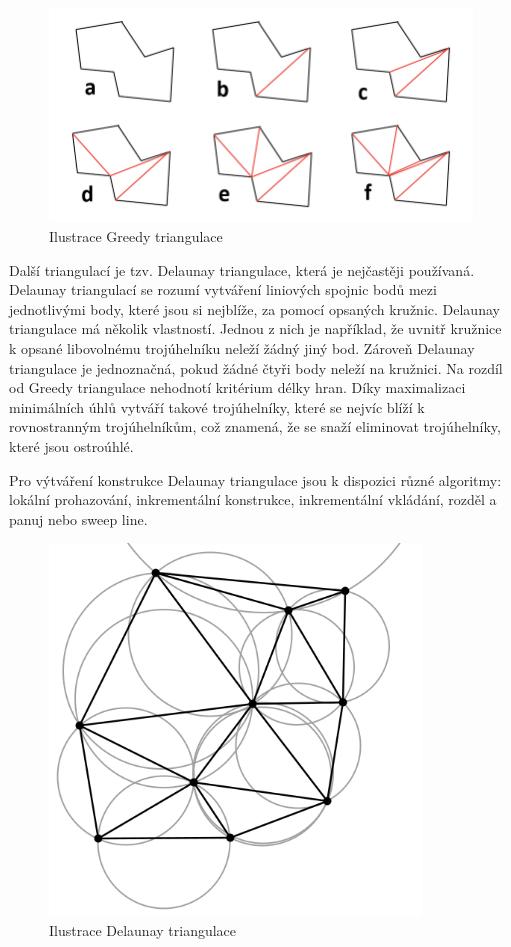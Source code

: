 \begin{figure}[H] \centering
    \includegraphics[width=400pt]{./pictures/triangulace-greedy.png}
    \caption[Ilustrace Greedy triangulace]{Ilustrace Greedy triangulace \cite{triangulace-greedy}}
	\label{fig:triangulace-greedy}              
\end{figure}

Další triangulací je tzv. Delaunay triangulace, která je nejčastěji používaná.
Delaunay triangulací se rozumí vytváření liniových spojnic bodů mezi jednotlivými body, které jsou si nejblíže,
za pomocí opsaných kružnic. Delaunay triangulace má několik vlastností. Jednou z nich je například,
že uvnitř kružnice k opsané libovolnému trojúhelníku neleží žádný jiný bod.
Zároveň Delaunay triangulace je jednoznačná, pokud žádné čtyři body neleží na kružnici.
Na rozdíl od Greedy triangulace nehodnotí kritérium délky hran. Díky maximalizaci minimálních
úhlů vytváří takové trojúhelníky, které se nejvíc blíží k rovnostranným trojúhelníkům, 
což znamená, že se snaží eliminovat trojúhelníky, které jsou ostroúhlé.

Pro výtváření konstrukce Delaunay triangulace jsou k dispozici různé algoritmy: lokální prohazování, 
inkrementální konstrukce, inkrementální vkládání, rozděl a panuj nebo sweep line. \cite{bayer-delaunay}

\begin{figure}[H] \centering
    \includegraphics[width=280pt]{./pictures/triangulace-delaunay.png}
    \caption[Ilustrace Delaunay triangulace]{Ilustrace Delaunay triangulace \cite{triangulace-delaunay}}
	\label{fig:triangulace-delaunay}              
\end{figure}


